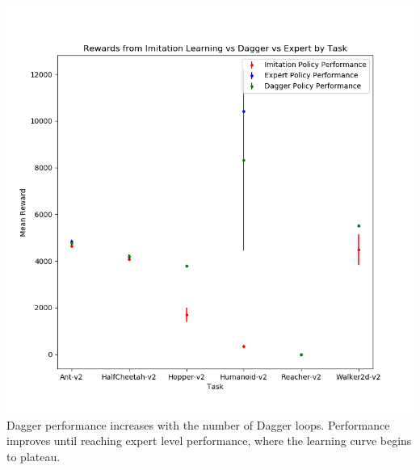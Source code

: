 \documentclass{article}
\begin{document}
    \includegraphics[scale=0.7]{overallComparison}\\
    
    Dagger performance increases with the number of Dagger loops. Performance 
    improves until reaching expert level performance, where the learning 
    curve begins to plateau.
\end{document}

